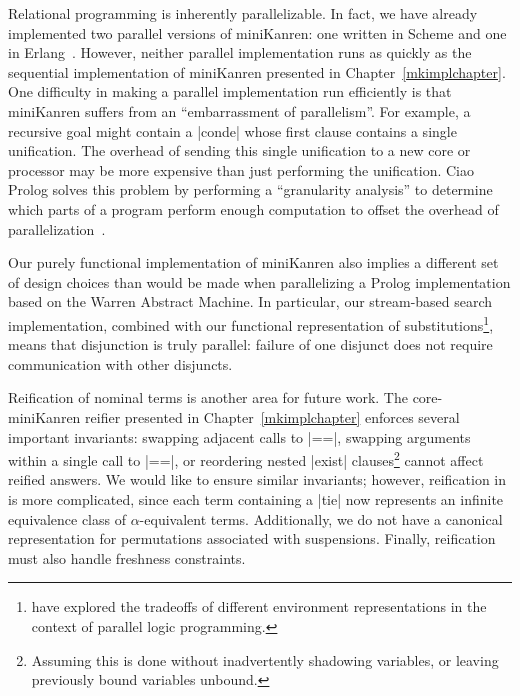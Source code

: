 Relational programming is inherently parallelizable.  In fact, we have
already implemented two parallel versions of miniKanren: one written
in Scheme and one in Erlang~\cite{armstrong03}. However, neither
parallel implementation runs as quickly as the sequential
implementation of miniKanren presented in Chapter~\ref{mkimplchapter}.
One difficulty in making a parallel implementation run efficiently is
that miniKanren suffers from an ``embarrassment of parallelism''.  For
example, a recursive goal might contain a \scheme|conde| whose first
clause contains a single unification. The overhead of sending this
single unification to a new core or processor may be more expensive
than just performing the unification. Ciao Prolog solves this problem
by performing a ``granularity analysis'' to determine which parts of a
program perform enough computation to offset the overhead of
parallelization~\cite{granularity90,lopez96methodology}.

Our purely functional implementation of miniKanren also implies a
different set of design choices than would be made when parallelizing
a Prolog implementation based on the Warren Abstract Machine. In
particular, our stream-based search implementation, combined with our
functional representation of
substitutions\footnote{\citet{gupta93analysis} have explored the
  tradeoffs of different environment representations in the context of
  parallel logic programming.}, means that disjunction is truly
parallel: failure of one disjunct does not require communication with
other disjuncts.

Reification of nominal terms is another area for future work.  The
core-miniKanren reifier presented in Chapter~\ref{mkimplchapter}
enforces several important invariants: swapping adjacent calls to
\scheme|==|, swapping arguments within a single call to \scheme|==|,
or reordering nested \scheme|exist| clauses\footnote{Assuming this is
  done without inadvertently shadowing variables, or leaving
  previously bound variables unbound.} cannot affect reified answers.
We would like \alphakanrensp to ensure similar invariants; however,
reification in \alphakanrensp is more complicated, since each term
containing a \scheme|tie| now represents an infinite equivalence class
of $\alpha$-equivalent terms. Additionally, we do not have a canonical
representation for permutations associated with suspensions. Finally,
reification must also handle freshness constraints.

